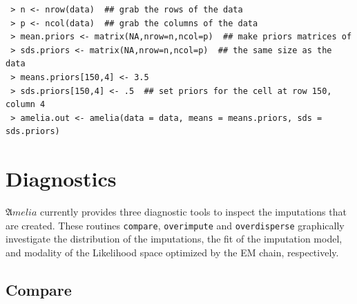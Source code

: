 \documentclass[12pt,titlepage]{article}
\newcommand{\Amelia}{\ensuremath{\mathfrak Amelia} }
\begin{document}
\begin{verbatim}
 > n <- nrow(data)  ## grab the rows of the data
 > p <- ncol(data)  ## grab the columns of the data
 > mean.priors <- matrix(NA,nrow=n,ncol=p)  ## make priors matrices of
 > sds.priors <- matrix(NA,nrow=n,ncol=p)  ## the same size as the data
 > means.priors[150,4] <- 3.5
 > sds.priors[150,4] <- .5  ## set priors for the cell at row 150, column 4
 > amelia.out <- amelia(data = data, means = means.priors, sds = sds.priors)
\end{verbatim}


\section{Diagnostics}\label{sec:diag}

\Amelia currently provides three diagnostic tools to inspect the
imputations that are created.  These routines \texttt{compare},
\texttt{overimpute} and \texttt{overdisperse} graphically investigate
the distribution of the imputations, the fit of the imputation model,
and modality of the Likelihood space optimized by the EM chain,
respectively.

\subsection{Compare}
\end{document}
